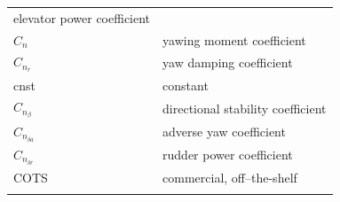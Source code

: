\documentclass[
]{book}
\begin{document}
\begin{longtable}[]{@{}ll@{}}
\begin{minipage}[t]{0.47\columnwidth}
elevator power coefficient\strut
\end{minipage}\tabularnewline
\begin{minipage}[t]{0.47\columnwidth}\raggedright
\(C_n\)\strut
\end{minipage} & \begin{minipage}[t]{0.47\columnwidth}\raggedright
yawing moment coefficient\strut
\end{minipage}\tabularnewline
\begin{minipage}[t]{0.47\columnwidth}\raggedright
\(C_{n_r}\)\strut
\end{minipage} & \begin{minipage}[t]{0.47\columnwidth}\raggedright
yaw damping coefficient\strut
\end{minipage}\tabularnewline
\begin{minipage}[t]{0.47\columnwidth}\raggedright
cnst\strut
\end{minipage} & \begin{minipage}[t]{0.47\columnwidth}\raggedright
constant\strut
\end{minipage}\tabularnewline
\begin{minipage}[t]{0.47\columnwidth}\raggedright
\(C_{n_{\beta}}\)\strut
\end{minipage} & \begin{minipage}[t]{0.47\columnwidth}\raggedright
directional stability coefficient\strut
\end{minipage}\tabularnewline
\begin{minipage}[t]{0.47\columnwidth}\raggedright
\(C_{n_{\delta a}}\)\strut
\end{minipage} & \begin{minipage}[t]{0.47\columnwidth}\raggedright
adverse yaw coefficient\strut
\end{minipage}\tabularnewline
\begin{minipage}[t]{0.47\columnwidth}\raggedright
\(C_{n_{\delta r}}\)\strut
\end{minipage} & \begin{minipage}[t]{0.47\columnwidth}\raggedright
rudder power coefficient\strut
\end{minipage}\tabularnewline
\begin{minipage}[t]{0.47\columnwidth}\raggedright
COTS\strut
\end{minipage} & \begin{minipage}[t]{0.47\columnwidth}\raggedright
commercial, off--the-shelf\strut
\end{minipage}\tabularnewline
\begin{minipage}[t]{0.47\columnwidth}\raggedright

\end{minipage}
\end{longtable}
\end{document}
